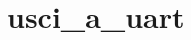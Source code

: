 \hypertarget{group__usci__a__uart__api}{}\section{usci\+\_\+a\+\_\+uart}
\label{group__usci__a__uart__api}
